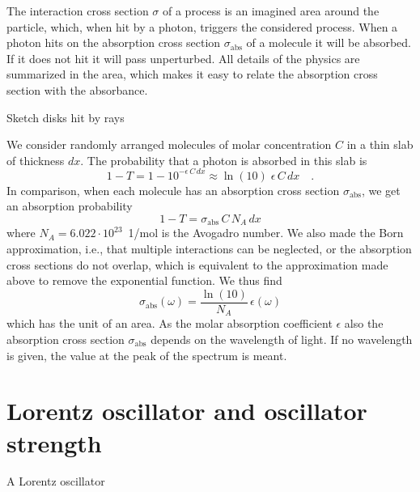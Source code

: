 The interaction cross section $\sigma$ of a process is an imagined area around the particle, which, when hit by a photon, triggers the considered process. When a photon hits on the absorption cross section $\sigma_{\text{abs}}$ of a molecule it will be absorbed. If it does not hit it will pass unperturbed. All details of the physics are summarized in the area, which makes it easy to relate the absorption cross section with the absorbance. 
\begin{marginfigure}
\caption{Sketch  disks hit by rays}
\end{marginfigure}


We consider randomly arranged molecules of molar concentration $C$ in a thin slab of thickness $dx$. The probability that a photon is absorbed in this slab is
\begin{equation}
 1 - T =1 -  10^{- \epsilon\, C \, dx} \approx \ln (10) \; \epsilon\, C \, dx \quad .
\end{equation}
In comparison, when each molecule has an absorption cross section $\sigma_{\text{abs}}$, we get an absorption probability 
\begin{equation}
 1 - T = \sigma_{\text{abs}} \, C \, N_A \, dx
\end{equation}
where $N_A = 6.022 \cdot 10^{23}$~{1/mol} is the Avogadro number.  We also made the Born approximation, i.e., that multiple interactions can be neglected, or the absorption cross sections do not overlap, which is equivalent to the approximation made above to remove the exponential function.  We thus find
\begin{equation}
 \sigma_{\text{abs}}(\omega) =  \frac{\ln(10)}{ N_A } \, \epsilon(\omega)
\end{equation}
which has the unit of an area. As the  molar absorption coefficient $\epsilon$  also the absorption cross section $\sigma_{\text{abs}}$ depends on the wavelength of light. If no wavelength is given, the value at the peak of the spectrum is meant.


\section{Lorentz oscillator and oscillator strength}


\begin{marginfigure}
\caption{A Lorentz oscillator}
\end{marginfigure}


